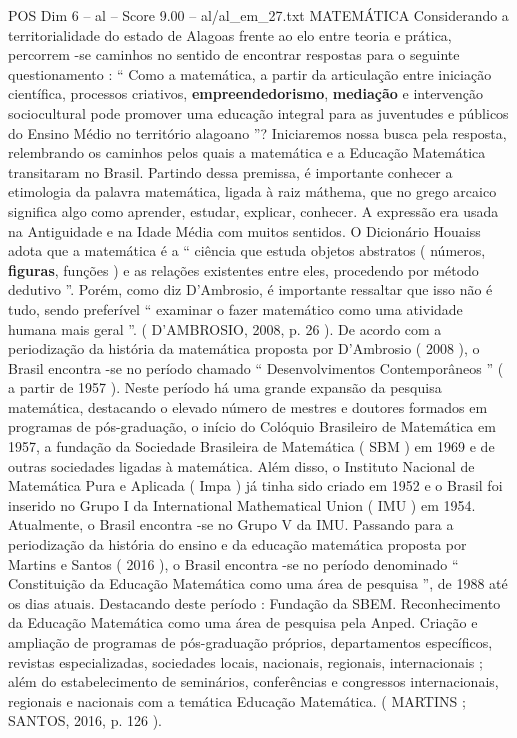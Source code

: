 \begin{textsample}{POS Dim 6 – al – Score 9.00 – al/al\_em\_27.txt}  \label{ex:f6_pos_224}
MATEMÁTICA Considerando a territorialidade do estado de Alagoas frente ao elo entre teoria e prática, percorrem -se caminhos no sentido de encontrar respostas para o seguinte questionamento : “ Como a matemática, a partir da articulação entre iniciação científica, processos criativos, \textbf{empreendedorismo}, \textbf{mediação} e intervenção sociocultural pode promover uma educação integral para as juventudes e públicos do Ensino Médio no território alagoano ”?
Iniciaremos nossa busca pela resposta, relembrando os caminhos pelos quais a matemática e a Educação Matemática transitaram no Brasil.
Partindo dessa premissa, é importante conhecer a etimologia da palavra matemática, ligada à raiz máthema, que no grego arcaico significa algo como aprender, estudar, explicar, conhecer.
A expressão era usada na Antiguidade e na Idade Média com muitos sentidos.
O Dicionário Houaiss adota que a matemática é a “ ciência que estuda objetos abstratos ( números, \textbf{figuras}, funções ) e as relações existentes entre eles, procedendo por método dedutivo ”.
Porém, como diz D’Ambrosio, é importante ressaltar que isso não é tudo, sendo preferível “ examinar o fazer matemático como uma atividade humana mais geral ”. ( D’AMBROSIO, 2008, p. 26 ).
De acordo com a periodização da história da matemática proposta por D’Ambrosio ( 2008 ), o Brasil encontra -se no período chamado “ Desenvolvimentos Contemporâneos ” ( a partir de 1957 ).
Neste período há uma grande expansão da pesquisa matemática, destacando o elevado número de mestres e doutores formados em programas de pós-graduação, o início do Colóquio Brasileiro de Matemática em 1957, a fundação da Sociedade Brasileira de Matemática ( SBM ) em 1969 e de outras sociedades ligadas à matemática.
Além disso, o Instituto Nacional de Matemática Pura e Aplicada ( Impa ) já tinha sido criado em 1952 e o Brasil foi inserido no Grupo I da International Mathematical Union ( IMU ) em 1954.
Atualmente, o Brasil encontra -se no Grupo V da IMU.
Passando para a periodização da história do ensino e da educação matemática proposta por Martins e Santos ( 2016 ), o Brasil encontra -se no período denominado “ Constituição da Educação Matemática como uma área de pesquisa ”, de 1988 até os dias atuais.
Destacando deste período : Fundação da SBEM.
Reconhecimento da Educação Matemática como uma área de pesquisa pela Anped.
Criação e ampliação de programas de pós-graduação próprios, departamentos específicos, revistas especializadas, sociedades locais, nacionais, regionais, internacionais ; além do estabelecimento de seminários, conferências e congressos internacionais, regionais e nacionais com a temática Educação Matemática. ( MARTINS ; SANTOS, 2016, p. 126 ).

\end{textsample}
